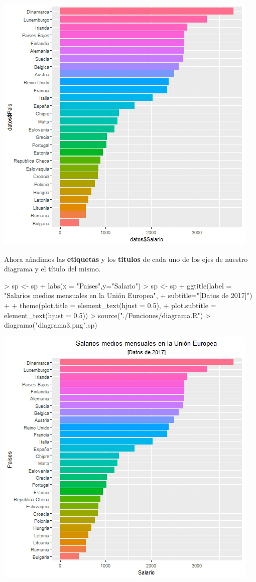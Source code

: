 \documentclass [a4paper] {article}
\begin{document}
\includegraphics[width=\textwidth]{diagrama2}

\bigskip
Ahora añadimos las \textbf{etiquetas} y los \textbf{titulos} de cada uno de los ejes de nuestro diagrama y el título del mismo.
\begin{Schunk}
\begin{Sinput}
> sp <- sp + labs(x = "Paises",y="Salario")
> sp <- sp + ggtitle(label = "Salarios medios mensuales en la Unión Europea",
+         subtitle="[Datos de 2017]") + 
+         theme(plot.title = element_text(hjust = 0.5),
+         plot.subtitle = element_text(hjust = 0.5))
> source("./Funciones/diagrama.R")
> diagrama("diagrama3.png",sp)
\end{Sinput}
\end{Schunk}

\includegraphics[width=\textwidth]{diagrama3}
\end{document}
